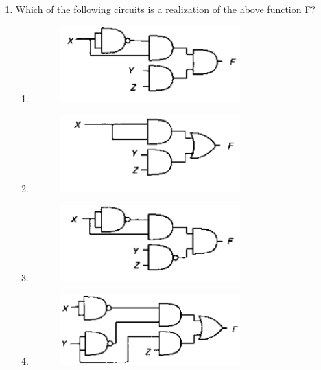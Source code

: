 \documentclass[12pt]{article}
\theoremstyle{remark}
\begin{document}
\begin{enumerate}
\item Which of the following circuits is a realization of the above function F?
\begin{enumerate}
    \item \begin{figure}[H]\centering\includegraphics[width=0.7\textwidth]{Figs/Q53A.png}\caption{}\label{fig:1.47}\end{figure}
    \item \begin{figure}[H]\centering\includegraphics[width=0.7\textwidth]{Figs/Q53B.png}\caption{}\label{fig:1.48}\end{figure}
    \item \begin{figure}[H]\centering\includegraphics[width=0.7\textwidth]{Figs/Q53C.png}\caption{}\label{fig:1.49}\end{figure}
    \item \begin{figure}[H]\centering\includegraphics[width=0.7\textwidth]{Figs/Q53D.png}\caption{}\label{fig:1.50}\end{figure}
\end{enumerate}
\hfill{}


\end{enumerate}
\end{document}
